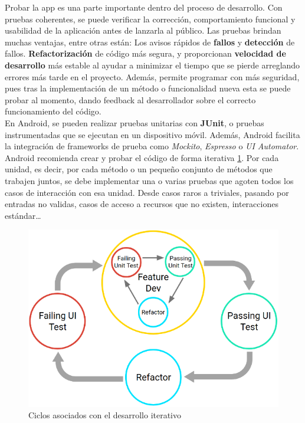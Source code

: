 Probar la app es una parte importante dentro del proceso de desarrollo. Con pruebas coherentes, se puede verificar la corrección, comportamiento funcional y usabilidad de la aplicación antes de lanzarla al público. Las pruebas brindan muchas ventajas, entre otras están: Los avisos rápidos de \textbf{fallos} y \textbf{detección} de fallos. \textbf{Refactorización} de código más segura, y proporcionan \textbf{velocidad de desarrollo} más estable al ayudar a minimizar el tiempo que se pierde arreglando errores más tarde en el proyecto. Además, permite programar con más seguridad, pues tras la implementación de un método o funcionalidad nueva esta se puede probar al momento, dando feedback al desarrollador sobre el correcto funcionamiento del código. \\

En Android, se pueden realizar pruebas unitarias con \textbf{JUnit}, o pruebas instrumentadas que se ejecutan en un dispositivo móvil. Además, Android facilita la integración de frameworks de prueba como \emph{Mockito}\cite{mockito}, \emph{Espresso}\cite{espresso} o \emph{UI Automator}\cite{uia}. Android recomienda crear y probar el código de forma iterativa \ref{fig:iterativo}. Por cada unidad, es decir, por cada método o un pequeño conjunto de métodos que trabajen juntos, se debe implementar una o varias pruebas que agoten todos los casos de interacción con esa unidad. Desde casos raros a triviales, pasando por entradas no validas, casos de acceso a recursos que no existen, interacciones estándar\dots \\

\begin{figure}[h!]
  \centering
  \includegraphics[width=0.8\linewidth]{figs/Desarrollo/Pruebas/iterativo}
  \caption[Ciclos asociados con el desarrollo iterativo]{Ciclos asociados con el desarrollo iterativo}
  \label{fig:iterativo}
\end{figure}


